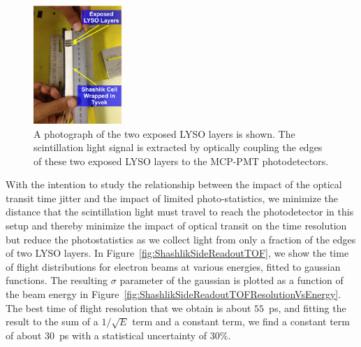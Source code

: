 \documentclass[12pt]{article}
\begin{document}
\begin{figure}[H] \centering
\includegraphics[width=0.30\textwidth]{figs/ShashlikSideReadoutPhotoA} 
\caption{ A photograph of the two exposed LYSO layers is shown.
The scintillation light signal is extracted by optically coupling
the edges of these two exposed LYSO layers to the MCP-PMT
photodetectors. } 
\label{fig:ShashlikSideReadoutExposedLayersPhoto}
\end{figure}

With the intention to study the relationship between the impact of the 
optical transit time jitter and the impact of limited photo-statistics,
we minimize the distance that the scintillation light
must travel to reach the photodetector in this setup and thereby minimize the
impact of optical transit on the time resolution but reduce the photostatistics 
as we collect light from only a fraction of the edges of two LYSO layers. 
In Figure~\ref{fig:ShashlikSideReadoutTOF}, we show the 
time of flight distributions for electron beams at various energies, 
fitted to gaussian functions. The resulting
$\sigma$ parameter of the gaussian is plotted as a function of the
beam energy in Figure~\ref{fig:ShashlikSideReadoutTOFResolutionVsEnergy}.
The best time of flight resolution that we obtain is about $55$~ps, and
fitting the result to the sum of a $1/\sqrt{E}$ term and a constant term,
we find a constant term of about $30$~ps with a statistical uncertainty of $30\%$. 
\end{document}
